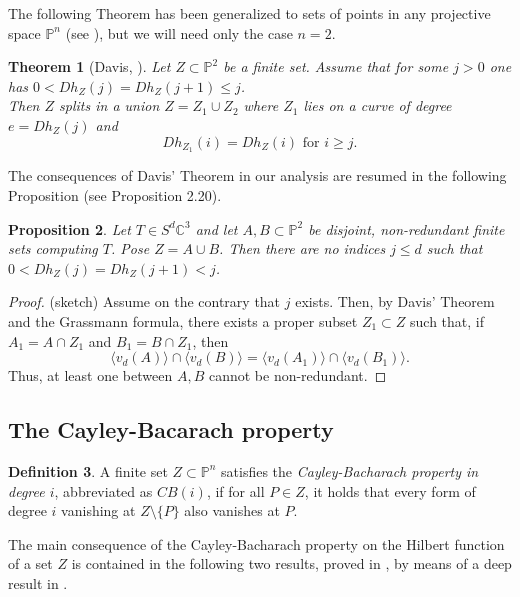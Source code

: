 \documentclass{amsart}
\newcommand{\C}{\mathbb{C}}
\newcommand{\Pj}{\mathbb{P}}
\newtheorem{thm0}{Theorem}[section]
\newtheorem{prop0}[thm0]{Proposition}
\theoremstyle{definition}
\newtheorem{defn0}[thm0]{Definition}
\begin{document}
The following Theorem has been generalized to sets of points in any projective space $\Pj^n$ (see \cite{BigaGerMig94}), but we
will need only the case $n=2$.


\begin{thm0}[Davis, \cite{Davis85}]\label{thm:Davis}
Let $ Z \subset \Pj^{2} $ be a finite set. Assume that for some $j>0$ one has
$ 0<Dh_{Z}(j) = Dh_{Z}(j+1)\leq j  $.\\
Then $Z$ splits in a union $ Z = Z_{1} \cup Z_{2} $ where $ Z_{1} $ lies on a curve of degree $ e=Dh_{Z}(j)$ and 
 $$ Dh_{Z_1}(i) = Dh_{Z}(i)  \mbox{ for } i\geq j.$$
\end{thm0}

The consequences of Davis' Theorem in our analysis are resumed in the following Proposition (see \cite{AngeC} Proposition 2.20).

\begin{prop0}\label{Dav}
Let $ T \in S^{d}\C^{3} $ and let $ A,B \subset \Pj^{2} $ be disjoint, non-redundant finite sets computing $ T $. Pose $ Z = A \cup B$.
Then there are no  indices $j\leq d$ such that  $ 0<Dh_{Z}(j) = Dh_{Z}(j+1) < j  $.
\end{prop0}
\begin{proof} (sketch) Assume on the contrary that $j$ exists. Then, by Davis' Theorem and the Grassmann formula, there exists a proper subset $Z_1\subset Z$
such that, if $A_1=A\cap Z_1$ and $B_1=B\cap Z_1$, then 
$$ \langle v_d(A)\rangle\cap \langle v_d(B)\rangle = \langle v_d(A_1)\rangle\cap \langle v_d(B_1) \rangle.$$
Thus, at least one between $A,B$ cannot be non-redundant.
\end{proof}



\subsection{The Cayley-Bacarach property}\label{sec:CB}

\begin{defn0}\label{def:CB}
A finite set $Z\subset \Pj^n$ satisfies the \emph{Cayley-Bacharach property in degree $i$}, abbreviated as $\mathit{CB}(i)$, if for all $P \in Z$, 
it holds that every form of degree $i$ vanishing at $ Z\setminus\{ P\}$ also vanishes at $P$.
\end{defn0}

The main consequence of the Cayley-Bacharach property on the Hilbert function of a set $Z$ is contained in the following two results,
proved in \cite{AngeCVan18}, by means of a deep result in \cite{GerKreuzerRobbiano93}.
\end{document}
